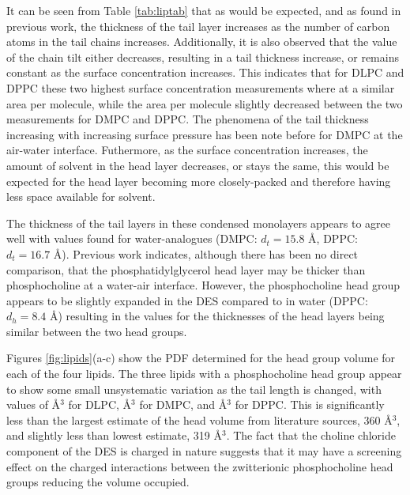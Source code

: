 \documentclass[twoside,twocolumn,9pt]{article}
\begin{document}
It can be seen from Table \ref{tab:liptab} that as would be expected, and as found in previous work,\cite{Mohwald1990,Vaknin1991} the thickness of the tail layer increases as the number of carbon atoms in the tail chains increases. Additionally, it is also observed that the value of the chain tilt either decreases, resulting in a tail thickness increase, or remains constant as the surface concentration increases. This indicates that for DLPC and DPPC these two highest surface concentration measurements where at a similar area per molecule, while the area per molecule slightly decreased between the two measurements for DMPC and DPPC. The phenomena of the tail thickness increasing with increasing surface pressure has been note before for DMPC at the air-water interface.\cite{Bayerl1990} Futhermore, as the surface concentration increases, the amount of solvent in the head layer decreases, or stays the same, this would be expected for the head layer becoming more closely-packed and therefore having less space available for solvent. 

The thickness of the tail layers in these condensed monolayers appears to agree well with values found for water-analogues (DMPC: $d_t=15.8$ \AA,\cite{Johnson1991} DPPC: $d_t=16.7$ \AA\cite{Helm1987}). Previous work indicates, although there has been no direct comparison, that the phosphatidylglycerol head layer may be thicker than phosphocholine at a water-air interface.\cite{Clifton2012,Johnson1991,Vaknin1991,Lawrie2000} However, the phosphocholine head group appears to be slightly expanded in the DES compared to in water (DPPC: $d_h=8.4$ \AA\cite{Helm1987}) resulting in the values for the thicknesses of the head layers being similar between the two head groups. 

Figures \ref{fig:lipids}(a-c) show the PDF determined for the head group volume for each of the four lipids. The three lipids with a phosphocholine head group appear to show some small unsystematic variation as the tail length is changed, with values of  \AA$^{3}$ for DLPC,  \AA$^{3}$ for DMPC, and  \AA$^{3}$ for DPPC. This is significantly less than the largest estimate of the head volume from literature sources, 360 \AA$^3$,\cite{Tardieu1973} and slightly less than lowest estimate, 319 \AA$^3$.\cite{Sun1994,Kucerka2004} The fact that the choline chloride component of the DES is charged in nature suggests that it may have a screening effect on the charged interactions between the zwitterionic phosphocholine head groups reducing the volume occupied.
\end{document}
